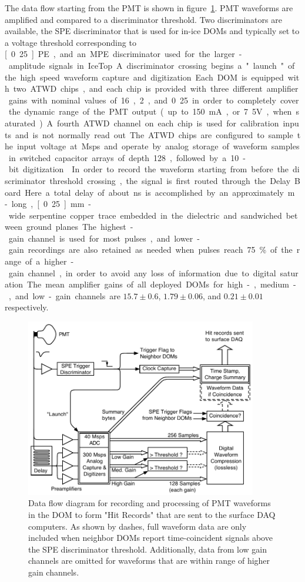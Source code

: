 The data flow starting from the PMT is shown in figure~\ref{fig:domdataflow}.
PMT waveforms are amplified and compared to a discriminator threshold.  Two
discriminators are available, the SPE discriminator that is used for in-ice DOMs
and typically set to a voltage threshold corresponding to \unit[0.25]PE,
and an MPE discriminator used for the larger-amplitude signals in IceTop.
A discriminator crossing begins a "launch" of the high speed waveform
capture and digitization. Each DOM is equipped with two ATWD chips,
and each chip is provided with three different amplifier
gains with nominal values of 16, 2, and 0.25 in order to completely cover the 
dynamic range of the PMT output (up to 150~mA, or 7.5V, when saturated).  A
fourth ATWD channel on each chip is used for calibration inputs and is not normally read out.
The ATWD chips are configured to sample the input voltage at \unit[300]Msps
and operate by analog storage of waveform samples in switched capacitor arrays of depth 128,
followed by a 10-bit digitization \cite{atwd}.  In order to record the waveform starting from before the discriminator
threshold crossing, the signal is first routed through the Delay Board.  Here a total delay of about
\unit[75]ns is accomplished by an approximately \unit[10]m-long, \unit[0.25]mm-wide
serpentine copper trace embedded in the dielectric and sandwiched between
ground planes.  The highest-gain channel is used
for most pulses, and lower-gain recordings are also retained as needed when pulses reach 75\% of the range 
of a higher-gain channel, in order to avoid any loss of information due to
digital saturation.  The mean amplifier gains of all deployed DOMs for high-,
medium-, and low-gain channels are $15.7\pm0.6$, $1.79\pm0.06$, and $0.21\pm0.01$ respectively.

\begin{figure}[h]
 \centering
 \includegraphics[width=0.9\textwidth]{graphics/dom/functional/domfig3-DOMDataFlow.pdf}
 \caption{Data flow diagram for recording and processing of PMT waveforms in the DOM to form 
 "Hit Records" that are sent to the surface DAQ computers.  As shown by dashes, full waveform data are only included
 when neighbor DOMs report time-coincident signals above the SPE discriminator threshold.  Additionally,
 data from low gain channels are omitted for waveforms that are within range of higher gain channels.}
 \label{fig:domdataflow}
\end{figure}

